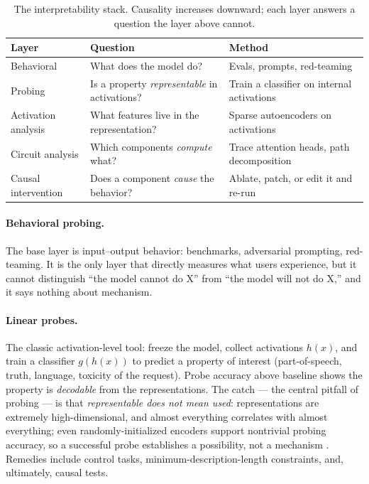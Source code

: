 \documentclass[11pt]{article}
\begin{document}
\begin{table}[h]
\centering
\begin{tabular}{lp{4.4cm}p{5.6cm}}
\hline
Layer & Question & Method \\
\hline
Behavioral & What does the model do? & Evals, prompts, red-teaming \\
Probing & Is a property \emph{representable} in activations? & Train a classifier on internal activations \\
Activation analysis & What features live in the representation? & Sparse autoencoders on activations \\
Circuit analysis & Which components \emph{compute} what? & Trace attention heads, path decomposition \\
Causal intervention & Does a component \emph{cause} the behavior? & Ablate, patch, or edit it and re-run \\
\hline
\end{tabular}
\caption{The interpretability stack. Causality increases downward; each layer answers a question the layer above cannot.}
\label{tab:stack}
\end{table}

\paragraph{Behavioral probing.} The base layer is input--output behavior: benchmarks, adversarial prompting, red-teaming. It is the only layer that directly measures what users experience, but it cannot distinguish ``the model cannot do X'' from ``the model will not do X,'' and it says nothing about mechanism.

\paragraph{Linear probes.} The classic activation-level tool: freeze the model, collect activations $h(x)$, and train a classifier $g(h(x))$ to predict a property of interest (part-of-speech, truth, language, toxicity of the request). Probe accuracy above baseline shows the property is \emph{decodable} from the representations. The catch --- the central pitfall of probing --- is that \emph{representable does not mean used}: representations are extremely high-dimensional, and almost everything correlates with almost everything; even randomly-initialized encoders support nontrivial probing accuracy, so a successful probe establishes a possibility, not a mechanism \cite{belinkov2022probing}. Remedies include control tasks, minimum-description-length constraints, and, ultimately, causal tests.
\end{document}
